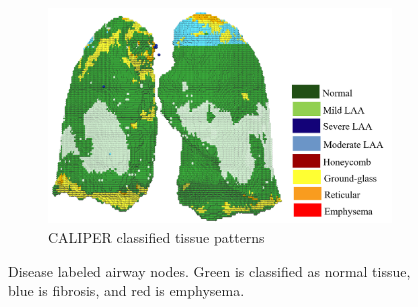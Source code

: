\begin{figure}[htbp]
\begin{subfigure}{.51\linewidth}%
  \includegraphics[width=\linewidth,trim={{.0\wd0} {.0\wd0} {.0\wd0} {.0\wd0}},clip]{ModelBasedAnalysis/Image/IPF501_CAPLIPERClassifiedData_colorbar.png}
  \caption{CALIPER classified tissue patterns}
  \label{fig:DiseaseLabeling-b} 
\end{subfigure}
\caption{Disease labeled airway nodes. Green is classified as normal tissue, blue is fibrosis, and red is emphysema.}
\label{fig:DiseaseLabeling}
\end{figure}


